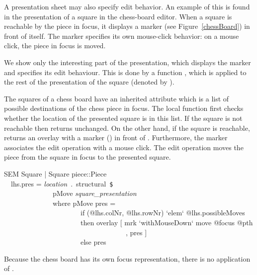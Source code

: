 A presentation sheet may also specify edit behavior. An example of this is found in the presentation of a square in the chess-board editor. When a square is reachable by the piece in focus, it displays a marker (see Figure~\ref{chessBoard}) in front of itself. The marker specifies its own mouse-click behavior: on a mouse click, the piece in focus is moved. 

We show only the interesting part of the presentation, which displays the marker and specifies its edit behaviour. This is done by a function , which is applied to the rest of the presentation of the square (denoted by ).

The squares of a chess board have an inherited attribute  which is a list of possible destinations of the chess piece in focus. The local function  first checks whether the location of the presented square  is in this list. If the square is not reachable then  returns   unchanged. On the other hand, if the square is reachable,  returns an overlay with a marker () in front of . Furthermore, the marker associates the edit operation  with a mouse click. The edit operation moves the piece from the square in focus to the presented square.
 
\ttfamily\begin{small}\begin{tabbing}
SEM Square | Square piece::Piece\\
~~lhs.pres = {\em location}~.~structural~\verb|$|\\
~~~~~~~~~~~~~~pMove {\em square\_presentation}\\
~~~~~~~~~~~~~~where pMove pres =\\
~~~~~~~~~~~~~~~~~~~~~~if (@lhs.colNr, @lhs.rowNr) `elem` @lhs.possibleMoves\\
~~~~~~~~~~~~~~~~~~~~~~then overlay [ mrk `withMouseDown` move @focus @pth\\
~~~~~~~~~~~~~~~~~~~~~~~~~~~~~~~~~~~, pres ]\\
~~~~~~~~~~~~~~~~~~~~~~else pres\\
\end{tabbing}\end{small}\rmfamily

Because the chess board has its own focus representation, there is no application of .



